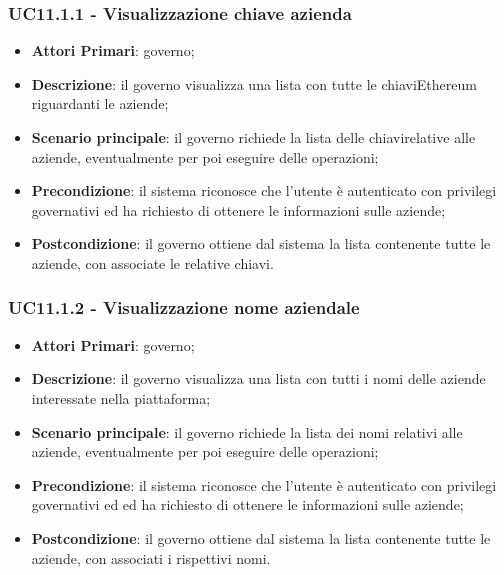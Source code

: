 \subsubsection{UC11.1.1 - Visualizzazione chiave azienda}
\begin{itemize}
	\item \textbf{Attori Primari}: governo;
	\item \textbf{Descrizione}: il governo visualizza una lista con tutte le chiavi\glosp Ethereum riguardanti le aziende;
	\item \textbf{Scenario principale}: il governo richiede la lista delle chiavi\glosp relative alle aziende, eventualmente per poi eseguire delle operazioni;
	\item \textbf{Precondizione}: il sistema riconosce che l'utente è autenticato con privilegi governativi ed ha richiesto di ottenere le informazioni sulle aziende;
	\item \textbf{Postcondizione}: il governo ottiene dal sistema la lista contenente tutte le aziende, con associate le relative chiavi\glo.
\end{itemize}
\subsubsection{UC11.1.2 - Visualizzazione nome aziendale}
\begin{itemize}
	\item \textbf{Attori Primari}: governo;
	\item \textbf{Descrizione}: il governo visualizza una lista con tutti i nomi delle aziende interessate nella piattaforma;
	\item \textbf{Scenario principale}: il governo richiede la lista dei nomi relativi alle aziende, eventualmente per poi eseguire delle operazioni;
	\item \textbf{Precondizione}: il sistema riconosce che l'utente è autenticato con privilegi governativi ed ed ha richiesto di ottenere le informazioni sulle aziende;
	\item \textbf{Postcondizione}: il governo ottiene dal sistema la lista contenente tutte le aziende, con associati i rispettivi nomi.
\end{itemize}
